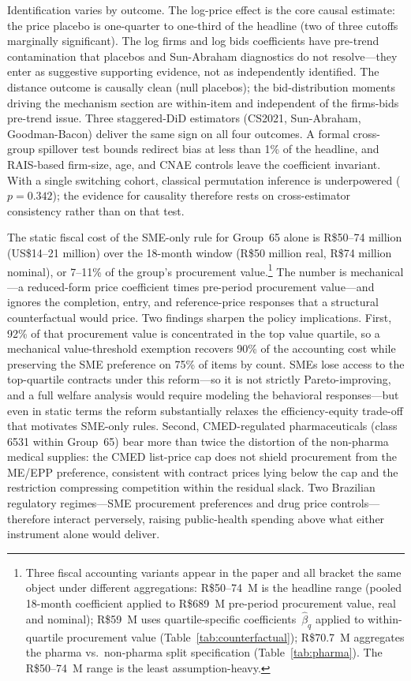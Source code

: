 Identification varies by outcome. The log-price effect is the core causal estimate: the price placebo is one-quarter to one-third of the headline (two of three cutoffs marginally significant). The log firms and log bids coefficients have pre-trend contamination that placebos and Sun-Abraham diagnostics do not resolve---they enter as suggestive supporting evidence, not as independently identified. The distance outcome is causally clean (null placebos); the bid-distribution moments driving the mechanism section are within-item and independent of the firms-bids pre-trend issue. Three staggered-DiD estimators (CS2021, Sun-Abraham, Goodman-Bacon) deliver the same sign on all four outcomes. A formal cross-group spillover test bounds redirect bias at less than 1\% of the headline, and RAIS-based firm-size, age, and CNAE controls leave the coefficient invariant. With a single switching cohort, classical permutation inference is underpowered ($p=0.342$); the evidence for causality therefore rests on cross-estimator consistency rather than on that test.

The static fiscal cost of the SME-only rule for Group~65 alone is R\$50--74 million (US\$14--21 million) over the 18-month window (R\$50 million real, R\$74 million nominal), or 7--11\% of the group's procurement value.\footnote{Three fiscal accounting variants appear in the paper and all bracket the same object under different aggregations: R\$50--74~M is the headline range (pooled 18-month coefficient applied to R\$689~M pre-period procurement value, real and nominal); R\$59~M uses quartile-specific coefficients~$\hat\beta_q$ applied to within-quartile procurement value (Table~\ref{tab:counterfactual}); R\$70.7~M aggregates the pharma vs.\ non-pharma split specification (Table~\ref{tab:pharma}). The R\$50--74~M range is the least assumption-heavy.} The number is mechanical---a reduced-form price coefficient times pre-period procurement value---and ignores the completion, entry, and reference-price responses that a structural counterfactual would price. Two findings sharpen the policy implications. First, 92\% of that procurement value is concentrated in the top value quartile, so a mechanical value-threshold exemption recovers 90\% of the accounting cost while preserving the SME preference on 75\% of items by count. SMEs lose access to the top-quartile contracts under this reform---so it is not strictly Pareto-improving, and a full welfare analysis would require modeling the behavioral responses---but even in static terms the reform substantially relaxes the efficiency-equity trade-off that motivates SME-only rules. Second, CMED-regulated pharmaceuticals (class 6531 within Group~65) bear more than twice the distortion of the non-pharma medical supplies: the CMED list-price cap does not shield procurement from the ME/EPP preference, consistent with contract prices lying below the cap and the restriction compressing competition within the residual slack. Two Brazilian regulatory regimes---SME procurement preferences and drug price controls---therefore interact perversely, raising public-health spending above what either instrument alone would deliver.

